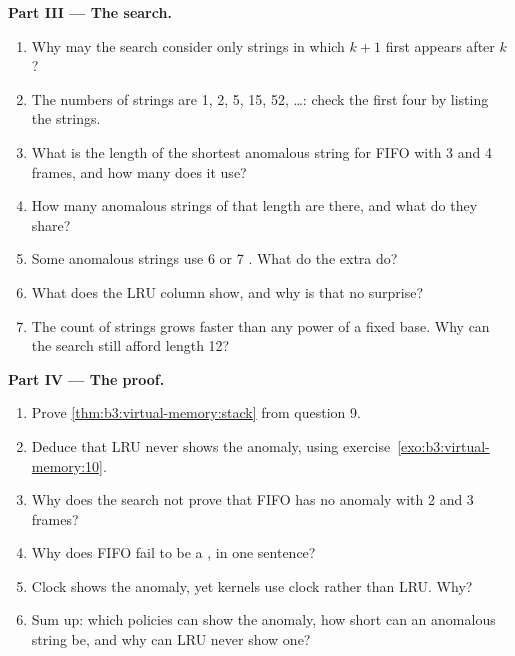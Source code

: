 \begin{problem}
\medskip\noindent\textbf{Part III --- The search.}
\begin{enumerate}[resume]
\item Why may the search consider only strings in which  $k + 1$ first appears after  $k$?
\item The numbers of strings are 1, 2, 5, 15, 52, \dots: check the first four by listing the strings.
\item What is the length of the shortest anomalous string for FIFO with 3 and 4 frames, and how many  does it use?
\item How many anomalous strings of that length are there, and what do they share?
\item Some anomalous strings use 6 or 7 . What do the extra  do?
\item What does the LRU column show, and why is that no surprise?
\item The count of strings grows faster than any power of a fixed base. Why can the search still afford length 12?
\end{enumerate}

\medskip\noindent\textbf{Part IV --- The proof.}
\begin{enumerate}[resume]
\item Prove \cref{thm:b3:virtual-memory:stack} from question 9.
\item Deduce that LRU never shows the anomaly, using exercise~\ref{exo:b3:virtual-memory:10}.
\item Why does the search not prove that FIFO has no anomaly with 2 and 3 frames?
\item Why does FIFO fail to be a , in one sentence?
\item Clock shows the anomaly, yet kernels use clock rather than LRU. Why?
\item Sum up: which policies can show the anomaly, how short can an anomalous string be, and why can LRU never show one?
\end{enumerate}
\end{problem}
